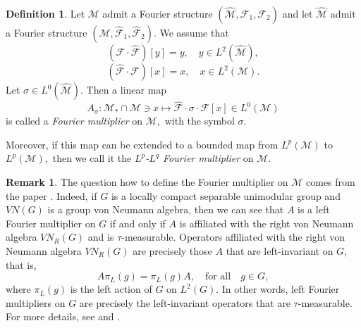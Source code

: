 \documentclass[a4paper,12pt]{amsart}
\numberwithin{equation}{section}
\theoremstyle{definition}
\newtheorem{defn}[thm]{Definition}
\newtheorem{rem}[thm]{Remark}
\begin{document}
\begin{defn}\label{Fourier-multp}  Let $\mathcal{M}$ admit a Fourier structure $(\widehat{\mathcal{M}},\mathcal{F}_1,\mathcal{F}_2)$ and let $\widehat{\mathcal{M}}$ admit a Fourier structure $(\mathcal{M}, \widehat{\mathcal{F}}_1, \widehat{\mathcal{F}}_2)$. We assume that 
    \begin{equation*}
    (\mathcal{F}\cdot \widehat{\mathcal{F}})[y] = y, \quad y\in L^2(\widehat{\mathcal{M}}),
    \end{equation*}
    \begin{equation*}
    (\widehat{\mathcal{F}}\cdot \mathcal{F})[x] = x, \quad x \in L^2(\mathcal{M}).
    \end{equation*}
    Let $\sigma\in L^0(\widehat{\mathcal{M}}).$ Then a linear map $$A_{\sigma}:\mathcal{M}_{*}\cap\mathcal{M} \ni x\mapsto\widehat{\mathcal{F}}\cdot\sigma\cdot\mathcal{F}[x]\in L^{0}(\mathcal{M})$$ is called a {\it Fourier multiplier} on $\mathcal{M},$ with the symbol $\sigma.$
    
    Moreover, if this map can be extended to a bounded map from $L^p(\mathcal{M})$ to $L^p(\mathcal{M}),$ then we call it the {\it $L^p$-$L^q$ Fourier multiplier} on $\mathcal{M}.$ 
\end{defn}

\begin{rem}The question how to define the Fourier multiplier on $\mathcal{M}$
comes from the paper \cite{AR}. Indeed, if $G$ is a locally compact separable unimodular group and $VN(G)$ is a group von Neumann algebra, then we can see that
$A$ is a left Fourier multiplier on $G$ if and only if $A$ is affiliated with the right von Neumann algebra $VN_R(G)$ and is $\tau$-measurable. Operators affiliated with the right von Neumann algebra $VN_R(G)$ are precisely those $A$ that are left-invariant on $G,$ that is,
$$A\pi_L(g)=\pi_L(g) A, \quad \text{for all}\quad g\in G,$$
where $\pi_L(g)$ is the left action of $G$ on $L^2(G).$
In other words, left Fourier multipliers on $G$ are
precisely the left-invariant operators that are $\tau$-measurable.
For more details, see \cite[Definition 2.16]{AR} and \cite[Remark 2.17]{AR}.
\end{rem}
\end{document}
